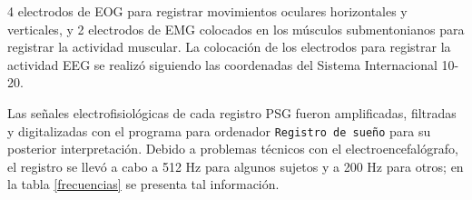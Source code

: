 4 electrodos de EOG para registrar movimientos oculares horizontales y verticales, 
y 2 electrodos de EMG colocados en los m\'usculos submentonianos para registrar la actividad 
muscular. 
La colocaci\'on de los electrodos para registrar la actividad EEG se realiz\'o siguiendo las 
coordenadas del Sistema Internacional 10-20\cite{Coleman87}.



Las se\~nales electrofisiol\'ogicas de cada registro PSG fueron amplificadas, filtradas y 
digitalizadas con el programa para ordenador \texttt{Registro de sue\~no} 
para su posterior interpretaci\'on. 
Debido a problemas t\'ecnicos con el electroencefal\'ografo, el registro se llev\'o a cabo
a 512 Hz para algunos sujetos y a 200 Hz para otros; en la tabla \ref{frecuencias}
se presenta tal informaci\'on.

